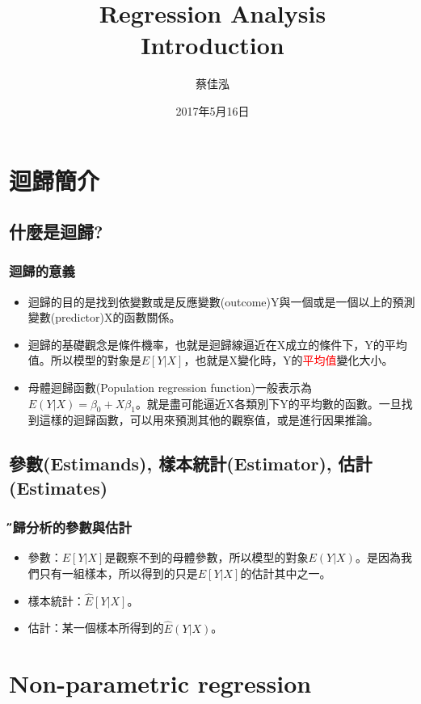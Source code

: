 \documentclass[xcolor=dvipsnames]{beamer}
\author[蔡佳泓]{\K 蔡佳泓}
\title[Statistical Methods for Social Sciences]{Regression Analysis\\
\smallskip
{\small {Introduction}}}
\date[5/16/2017]{2017年5月16日} %
\institute[ESC \& GIEAS]{\textbf{國立政治大學選舉研究中心暨東亞所}}
\begin{document}
\maketitle
\tableofcontents
\section{迴歸簡介}
\subsection{什麼是迴歸?}
\begin{frame} \frametitle{\K 迴歸的意義}
  \begin{itemize}
  \item 迴歸的目的是找到依變數或是反應變數(outcome)Y與一個或是一個以上的預測變數(predictor)X的函數關係。
  \item 迴歸的基礎觀念是條件機率，也就是迴歸線逼近在X成立的條件下，Y的平均值。所以模型的對象是$E[Y|X]$，也就是X變化時，Y的{\textcolor{red}{平均值}}變化大小。
 \item 母體迴歸函數(Population regression function)一般表示為$E(Y|X)=\beta_{0}+X\beta_{1}$。就是盡可能逼近X各類別下Y的平均數的函數。一旦找到這樣的迴歸函數，可以用來預測其他的觀察值，或是進行因果推論。
\end{itemize}
\end{frame}
\subsection{參數(Estimands), 樣本統計(Estimator), 估計(Estimates)}
\begin{frame}\frametitle{\H 迴歸分析的參數與估計}
\begin{itemize}
\item 參數：$E[Y|X]$是觀察不到的母體參數，所以模型的對象$E(Y|X)$。是因為我們只有一組樣本，所以得到的只是$E[Y|X]$的估計其中之一。
\item 樣本統計：$\hat{E}[Y|X]$。
\item 估計：某一個樣本所得到的$\hat{E}(Y|X)$。
\end{itemize}
\end{frame}

\section{Non-parametric regression}
\end{document}
